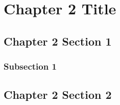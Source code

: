 \chapter{Chapter 2 Title}
\section{Chapter 2 Section 1}
\subsection{Subsection 1}
\section{Chapter 2 Section 2}
